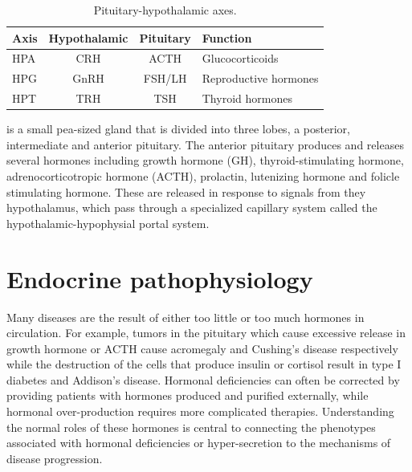 \documentclass{tufte-handout}
\begin{document}
\begin{table}
  \centering
  \begin{tabular}{lccl}
    \toprule
    Axis & Hypothalamic & Pituitary & Function \\
    \midrule
    HPA & CRH & ACTH & Glucocorticoids \\
    HPG & GnRH & FSH/LH & Reproductive hormones \\
    HPT & TRH & TSH & Thyroid hormones \\
    \bottomrule
  \end{tabular}
  \caption{Pituitary-hypothalamic axes.}
  \label{tab:pituitary-axes}
\end{table}

 is a small pea-sized gland that is divided into three lobes, a posterior, intermediate and anterior pituitary.  The anterior pituitary produces and releases several hormones including growth hormone (GH), thyroid-stimulating hormone, adrenocorticotropic hormone (ACTH), prolactin, lutenizing hormone and folicle stimulating hormone.  These are released in response to signals from they hypothalamus, which pass through a specialized capillary system called the hypothalamic-hypophysial portal system.    

\section{Endocrine pathophysiology}

Many diseases are the result of either too little or too much hormones in circulation.  For example, tumors in the pituitary which cause excessive release in growth hormone or ACTH cause acromegaly\cite{Marie1907} and Cushing's disease\cite{Cushing1932} respectively while the destruction of the cells that produce insulin or cortisol result in type I diabetes\cite{Banting1922b} and Addison's disease\cite{Addison1855}.  Hormonal deficiencies can often be corrected by providing patients with hormones produced and purified externally, while hormonal over-production requires  more complicated therapies.  Understanding the normal roles of these hormones is central to connecting the phenotypes associated with hormonal deficiencies or hyper-secretion to the mechanisms of disease progression.

\listoffigures
\listoftables



\end{document}
